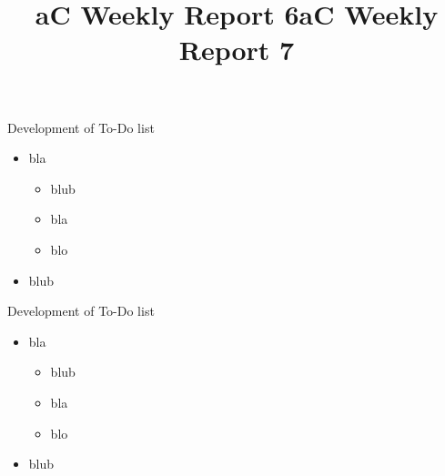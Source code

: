 \documentclass[11pt]{beamer}
\newcommand{\done}{\rlap{$\square$}{\raisebox{2pt}{\large\hspace{1pt}\ding{51}}}%
    \hspace{-2.5pt}}
\newcommand{\fail}{\rlap{$\square$}{\large\hspace{1pt}\ding{55}}}
\newcommand{\pend}{\rlap{$\square$}{\raisebox{2pt}{\large\hspace{1pt}}}%
    \hspace{6.5 pt}}
\begin{document}
\title[NV-aC6]{aC Weekly Report 6} 
\begin{frame}
\titlepage 
\end{frame}
\begin{frame}{Development of To-Do list}
\begin{itemize}
\item bla
\begin{itemize}
\item[\done] blub
\item[\fail] bla
\item[\pend] blo
\end{itemize}
\item blub
\end{itemize}
\end{frame} 

\title[NV-aC7]{aC Weekly Report 7} 
\begin{frame}
\titlepage 
\end{frame}
\begin{frame}{Development of To-Do list}
\begin{itemize}
\item bla
\begin{itemize}
\item[\done] blub
\item[\fail] bla
\item[\pend] blo
\end{itemize}
\item blub
\end{itemize}
\end{frame} 
\end{document}
